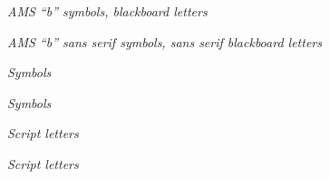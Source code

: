 \documentclass[12pt,a4paper]{article}
\begin{document}
\bigskip
\begin{center}
\textit{AMS ``b'' symbols, blackboard letters}
\end{center}
\vfill\clearpage

\bigskip
\begin{center}
\textit{AMS ``b'' sans serif symbols, sans serif blackboard letters}
\end{center}
\vfill\clearpage 

\bigskip
\begin{center}
\textit{Symbols}
\end{center}
\vfill\clearpage

\bigskip
\begin{center}
\textit{Symbols}
\end{center}
\vfill\clearpage

\bigskip
\begin{center}
\textit{Script letters}
\end{center}
\vfill\clearpage


\bigskip
\begin{center}
\textit{Script letters}
\end{center}
\vfill\clearpage
\end{document}
